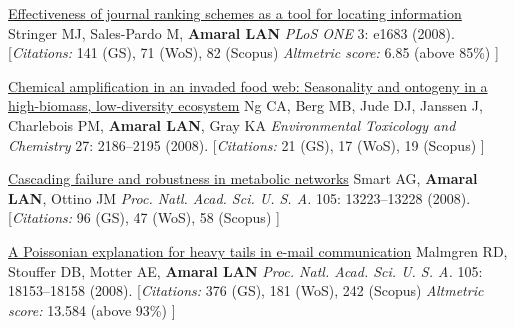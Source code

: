 \NumberedItem{\makebox[0.8cm][r]{[78]}}
\href{/people/amaral/effectiveness-journal-ranking-schemes-as-tool-for-locating-information}
{Effectiveness of journal ranking schemes as a tool for locating information}
\newline
Stringer MJ, Sales-Pardo M, {\textbf{Amaral LAN}}
\newline
\textit{PLoS ONE}
    3:
e1683 (2008).
    \newline
    \hfill [{\em{Citations:}} 141 (GS),
    71 (WoS), 82 (Scopus)
        {\hspace*{1cm} \em{Altmetric score:}}  6.85 (above 85\%)
    ]
\newline
\Gap
~
\Gap

\NumberedItem{\makebox[0.8cm][r]{[77]}}
\href{/people/amaral/chemical-amplification-in-an-invaded-food-web-seasonality-and-ontogeny-in-a-high-biomass-low-diversity-ecosystem}
{Chemical amplification in an invaded food web: Seasonality and ontogeny in a high-biomass, low-diversity ecosystem}
\newline
Ng CA, Berg MB, Jude DJ, Janssen J, Charlebois PM, {\textbf{Amaral LAN}}, Gray KA
\newline
\textit{Environmental Toxicology and Chemistry}
    27:
2186--2195 (2008).
    \newline
    \hfill [{\em{Citations:}} 21 (GS),
    17 (WoS), 19 (Scopus)
    ]
\newline
\Gap
~
\Gap

\NumberedItem{\makebox[0.8cm][r]{[76]}}
\href{/people/amaral/cascading-failure-and-robustness-in-metabolic-networks}
{Cascading failure and robustness in metabolic networks}
\newline
Smart AG, {\textbf{Amaral LAN}}, Ottino JM
\newline
\textit{Proc. Natl. Acad. Sci. U. S. A.}
    105:
13223--13228 (2008).
    \newline
    \hfill [{\em{Citations:}} 96 (GS),
    47 (WoS), 58 (Scopus)
    ]
\newline
\Gap
~
\Gap

\NumberedItem{\makebox[0.8cm][r]{[75]}}
\href{/people/amaral/a-poissonian-explanation-for-heavy-tails-in-e-mail-communication}
{A Poissonian explanation for heavy tails in e-mail communication}
\newline
Malmgren RD, Stouffer DB, Motter AE, {\textbf{Amaral LAN}}
\newline
\textit{Proc. Natl. Acad. Sci. U. S. A.}
    105:
18153--18158 (2008).
    \newline
    \hfill [{\em{Citations:}} 376 (GS),
    181 (WoS), 242 (Scopus)
        {\hspace*{1cm} \em{Altmetric score:}}  13.584 (above 93\%)
    ]
\newline
\Gap
~
\Gap

